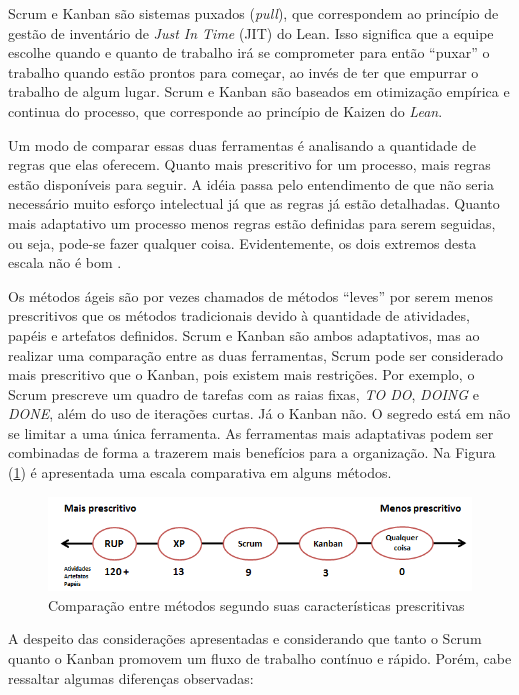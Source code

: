 Scrum e Kanban são sistemas puxados (\textit{pull}), que correspondem ao princípio de gestão de inventário de \textit{Just In Time} (JIT) do Lean. Isso significa que a equipe escolhe quando e quanto de trabalho irá se comprometer para então “puxar” o trabalho quando estão prontos para começar, ao invés de ter que empurrar o trabalho de algum lugar. Scrum e Kanban são baseados em otimização empírica e continua do processo, que corresponde ao princípio de Kaizen do \textit{Lean}.

Um modo de comparar essas duas ferramentas é analisando a quantidade de regras que elas oferecem. Quanto mais prescritivo for um processo, mais regras estão disponíveis para seguir. A idéia passa pelo entendimento de que não seria necessário muito esforço intelectual já que as regras já estão detalhadas. Quanto mais adaptativo um processo menos regras estão definidas para serem seguidas, ou seja, pode-se fazer qualquer coisa. Evidentemente, os dois extremos desta escala não é bom   \cite{kniberg2009}. 

Os métodos ágeis são por vezes chamados de métodos “leves” por serem menos prescritivos que os métodos tradicionais devido à quantidade de atividades, papéis e artefatos definidos. Scrum e Kanban são ambos adaptativos, mas ao realizar uma comparação entre as duas ferramentas, Scrum pode ser considerado mais prescritivo que o Kanban, pois existem mais restrições. Por exemplo, o Scrum prescreve um quadro de tarefas com as raias fixas, \textit{TO DO}, \textit{DOING} e \textit{DONE}, além do uso de iterações curtas. Já o Kanban não. O segredo está em não se limitar a uma única ferramenta. As ferramentas mais adaptativas podem ser combinadas de forma a trazerem mais benefícios para a organização. Na Figura (\ref{prescritivo}) é apresentada uma escala comparativa em alguns métodos.

\begin{figure}[H]
		\centering
		\label{fig02}
			\includegraphics[scale=0.7]{figuras/prescritivo.png}
		\caption{Comparação entre métodos segundo suas características prescritivas \cite{kniberg2009}}
\label{prescritivo}
\end{figure}

A despeito das considerações apresentadas e considerando que tanto o Scrum quanto o Kanban promovem um fluxo de trabalho contínuo e rápido. Porém, cabe ressaltar algumas diferenças observadas:

